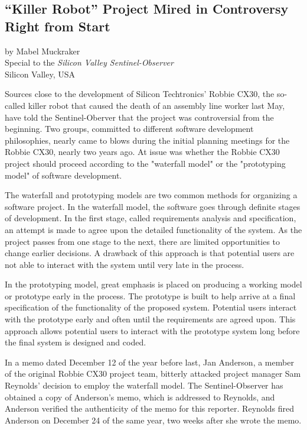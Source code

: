 \begin{center}
\section*{``Killer Robot'' Project Mired in Controversy Right from Start}
by Mabel Muckraker\\
Special to the \textit{Silicon Valley Sentinel-Observer}\\
Silicon Valley, USA
\end{center}

Sources close to the development of Silicon Techtronics' Robbie CX30, the so-called killer robot that caused the death of an assembly line worker last May, have told the Sentinel-Oberver that the project was controversial from the beginning. Two groups, committed to different software development philosophies, nearly came to blows during the initial planning meetings for the Robbie CX30, nearly two years ago. At issue was whether the Robbie CX30 project should proceed according to the "waterfall model" or the "prototyping model" of software development.

The waterfall and prototyping models are two common methods for organizing a software project. In the waterfall model, the software goes through definite stages of development. In the first stage, called requirements analysis and specification, an attempt is made to agree upon the detailed functionality of the system. As the project passes from one stage to the next, there are limited opportunities to change earlier decisions. A drawback of this approach is that potential users are not able to interact with the system until very late in the process.

In the prototyping model, great emphasis is placed on producing a working model or prototype early in the process. The prototype is built to help arrive at a final specification of the functionality of the proposed system. Potential users interact with the prototype early and often until the requirements are agreed upon. This approach allows potential users to interact with the prototype system long before the final system is designed and coded.

In a memo dated December 12 of the year before last, Jan Anderson, a member of the original Robbie CX30 project team, bitterly attacked project manager Sam Reynolds' decision to employ the waterfall model. The Sentinel-Observer has obtained a copy of Anderson's memo, which is addressed to Reynolds, and Anderson verified the authenticity of the memo for this reporter. Reynolds fired Anderson on December 24 of the same year, two weeks after she wrote the memo.

